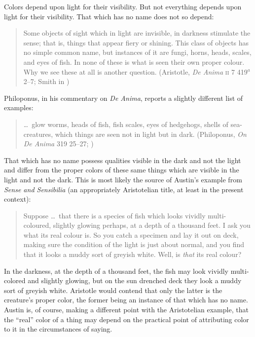 Colors depend upon light for their visibility. But not everything depends upon light for their visibility. That which has no name does not so depend:
\begin{quote}
	Some objects of sight which in light are invisible, in darkness stimulate the sense; that is, things that appear fiery or shining. This class of objects has no simple common name, but instances of it are fungi, horns, heads, scales, and eyes of fish. In none of these is what is seen their own proper colour. Why we see these at all is another question. (Aristotle, \emph{De Anima} \textsc{ii} 7 419\( ^{a} \)2--7; Smith in \citealt[33]{Barnes:1984uq})
\end{quote}
Philoponus, in his commentary on \emph{De Anima}, reports a slightly different list of examples:
\begin{quote}
	\ldots\ glow worms, heads of fish, fish scales, eyes of hedgehogs, shells of sea-creatures, which things are seen not in light but in dark. (Philoponus, \emph{On \emph{De Anima}} 319 25--27; \citealt[3]{Charlton:2005fk})
\end{quote}
That which has no name possess qualities visible in the dark and not the light and differ from the proper colors of these same things which are visible in the light and not the dark. This is most likely the source of Austin's example from \emph{Sense and Sensibilia} (an appropriately Aristotelian title, at least in the present context):
\begin{quote}
	Suppose \ldots\ that there is a species of fish which looks vividly multi-coloured, slightly glowing perhaps, at a depth of a thousand feet. I ask you what its real colour is. So you catch a specimen and lay it out on deck, making sure the condition of the light is just about normal, and you find that it looks a muddy sort of greyish white. Well, is \emph{that} its real colour? \citep[lecture \textsc{vii}, 65--66]{Austin:1962lr}
\end{quote}
In the darkness, at the depth of a thousand feet, the fish may look vividly multi-colored and slightly glowing, but on the sun drenched deck they look a muddy sort of greyish white. Aristotle would contend that only the latter is the creature's proper color, the former being an instance of that which has no name. Austin is, of course, making a different point with the Aristotelian example, that the ``real'' color of a thing may depend on the practical point of attributing color to it in the circumstances of saying.

